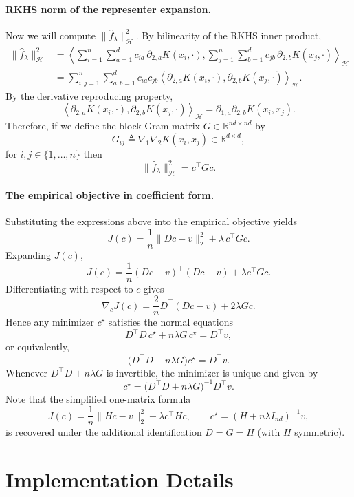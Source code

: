 \documentclass[11pt]{article}
\begin{document}
\paragraph{RKHS norm of the representer expansion.} Now we will compute \(\|\hat f_\lambda\|_\mathcal{H}^2\). By bilinearity of the RKHS inner product,
\begin{align*}
\|\hat f_\lambda\|_{\mathcal{H}}^2
&=
\left\langle
\sum_{i=1}^n \sum_{a=1}^d c_{ia}\,\partial_{2,a}K(x_i,\cdot),
\sum_{j=1}^n \sum_{b=1}^d c_{jb}\,\partial_{2,b}K(x_j,\cdot)
\right\rangle_{\mathcal{H}} \\
&=
\sum_{i,j=1}^n \sum_{a,b=1}^d
c_{ia}c_{jb}
\left\langle
\partial_{2,a}K(x_i,\cdot),
\partial_{2,b}K(x_j,\cdot)
\right\rangle_{\mathcal{H}}.
\end{align*}
By the derivative reproducing property,
\[
\left\langle
\partial_{2,a}K(x_i,\cdot),
\partial_{2,b}K(x_j,\cdot)
\right\rangle_{\mathcal{H}}
=
\partial_{1,a}\partial_{2,b}K(x_i,x_j).
\]
Therefore, if we define the block Gram matrix \(G \in \mathbb{R}^{nd\times nd}\) by
\[
G_{ij}
\triangleq
\nabla_1\nabla_2 K(x_i,x_j)\in\mathbb{R}^{d\times d},
\]
for $i,j \in \{1,\dots,n\}$ then
\[
\|\hat f_\lambda\|_{\mathcal{H}}^2 = c^\top G c.
\]
\paragraph{The empirical objective in coefficient form.}
Substituting the expressions above into the empirical objective yields
\[
J(c)
=
\frac{1}{n}\|Dc - v\|_2^2 + \lambda\, c^\top G c.
\]
Expanding \(J(c)\),
\[
J(c)
=
\frac{1}{n}(Dc-v)^\top(Dc-v) + \lambda c^\top G c.
\]
Differentiating with respect to \(c\) gives
\[
\nabla_c J(c)
=
\frac{2}{n}D^\top(Dc-v) + 2\lambda Gc.
\]
Hence any minimizer \(c^\star\) satisfies the normal equations
\[
D^\top D\,c^\star + n\lambda G\,c^\star = D^\top v,
\]
or equivalently,
\[
\bigl(D^\top D + n\lambda G\bigr)c^\star = D^\top v.
\]
Whenever \(D^\top D + n\lambda G\) is invertible, the minimizer is unique and given by
\[
c^\star
=
\bigl(D^\top D + n\lambda G\bigr)^{-1}D^\top v.
\]
Note that the simplified one-matrix formula
\[
J(c)=\frac{1}{n}\|Hc-v\|_2^2+\lambda c^\top H c,
\qquad
c^\star=(H+n\lambda I_{nd})^{-1}v,
\]
is recovered under the additional identification \(D=G=H\) (with \(H\) symmetric).



\section{Implementation Details}
\label{appendix:implementation_details}
\end{document}
